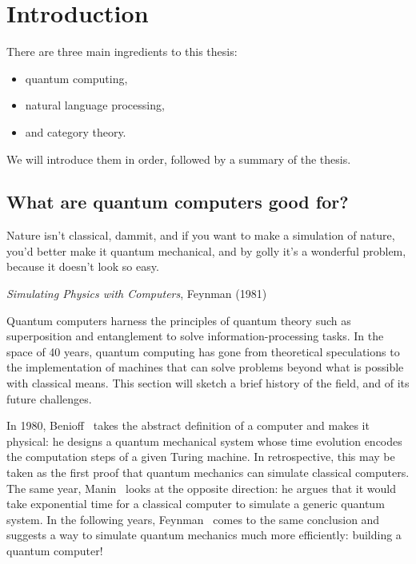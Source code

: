 
\chapter*{Introduction}

There are three main ingredients to this thesis:

\begin{itemize}
\item quantum computing,
\item natural language processing,
\item and category theory.
\end{itemize}

We will introduce them in order, followed by a summary of the thesis.

\section*{What are quantum computers good for?}
\epigraph{
Nature isn't classical, dammit, and if you want to make a simulation of
nature, you'd better make it quantum mechanical, and by golly it's a
wonderful problem, because it doesn't look so easy.
}{\textit{Simulating Physics with Computers}, Feynman (1981)}

Quantum computers harness the principles of quantum theory such as
superposition and entanglement to solve information-processing tasks. In
the space of 40 years, quantum computing has gone from theoretical
speculations to the implementation of machines that can solve problems
beyond what is possible with classical means. This section will sketch a
brief history of the field, and of its future challenges.

In 1980, Benioff~\cite{Benioff80} takes the abstract definition of a computer
and makes it physical: he designs a quantum mechanical system whose time evolution
encodes the computation steps of a given Turing machine. In
retrospective, this may be taken as the first proof that quantum
mechanics can simulate classical computers. The same year, Manin~\cite{Manin80} looks
at the opposite direction: he argues that it would take exponential time
for a classical computer to simulate a generic quantum system.
In the following years, Feynman~\cite{Feynman82,Feynman85} comes to the same
conclusion and suggests a way to simulate quantum mechanics much more
efficiently: building a quantum computer!

